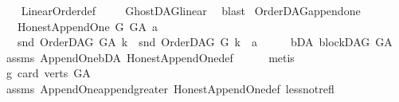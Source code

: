 \begin{isabellebody}
\ \ %
\endisadelimproof
%
\isatagproof
{}\isamarkupfalse%
\ Linear{\isacharunderscore}{\kern0pt}Order{\isacharunderscore}{\kern0pt}def\ \isanewline
\ \ \isamarkupfalse%
\ GhostDAG{\isacharunderscore}{\kern0pt}linear\ \isamarkupfalse%
\ blast%
\endisatagproof
{\isafoldproof}%
%
\isadelimproof
%
\endisadelimproof
%
\isadelimdocument
%
\endisadelimdocument
%
\isatagdocument
%
\isamarkuptrue%
%
\endisatagdocument
{\isafolddocument}%
%
\isadelimdocument
%
\endisadelimdocument
{}\isamarkupfalse%
\ OrderDAG{\isacharunderscore}{\kern0pt}append{\isacharunderscore}{\kern0pt}one{\isacharcolon}{\kern0pt}\isanewline
\ \ \ {\isachardoublequoteopen}Honest{\isacharunderscore}{\kern0pt}Append{\isacharunderscore}{\kern0pt}One\ G\ G{\isacharunderscore}{\kern0pt}A\ a{\isachardoublequoteclose}\isanewline
\ \ \ {\isachardoublequoteopen}snd\ {\isacharparenleft}{\kern0pt}OrderDAG\ G{\isacharunderscore}{\kern0pt}A\ k{\isacharparenright}{\kern0pt}\ {\isacharequal}{\kern0pt}\ snd\ {\isacharparenleft}{\kern0pt}OrderDAG\ G\ k{\isacharparenright}{\kern0pt}\ {\isacharat}{\kern0pt}\ {\isacharbrackleft}{\kern0pt}a{\isacharbrackright}{\kern0pt}{\isachardoublequoteclose}\isanewline
%
\isadelimproof
%
\endisadelimproof
%
\isatagproof
{}\isamarkupfalse%
\ {\isacharminus}{\kern0pt}\isanewline
\ \ \isamarkupfalse%
\ bD{\isacharunderscore}{\kern0pt}A{\isacharcolon}{\kern0pt}\ {\isachardoublequoteopen}blockDAG\ G{\isacharunderscore}{\kern0pt}A{\isachardoublequoteclose}\ \isamarkupfalse%
\ assms\ Append{\isacharunderscore}{\kern0pt}One{\isachardot}{\kern0pt}bD{\isacharunderscore}{\kern0pt}A\ Honest{\isacharunderscore}{\kern0pt}Append{\isacharunderscore}{\kern0pt}One{\isacharunderscore}{\kern0pt}def\isanewline
\ \ \ \ \isamarkupfalse%
\ metis\isanewline
\ \ \isamarkupfalse%
\ g{}{\isacharcolon}{\kern0pt}\ {\isachardoublequoteopen}card\ {\isacharparenleft}{\kern0pt}verts\ G{\isacharunderscore}{\kern0pt}A{\isacharparenright}{\kern0pt}\ {\isasymnoteq}\ {}{\isachardoublequoteclose}\ \isanewline
\ \ \ \ \isamarkupfalse%
\ assms\ Append{\isacharunderscore}{\kern0pt}One{\isachardot}{\kern0pt}append{\isacharunderscore}{\kern0pt}greater{\isacharunderscore}{\kern0pt}{}\ Honest{\isacharunderscore}{\kern0pt}Append{\isacharunderscore}{\kern0pt}One{\isacharunderscore}{\kern0pt}def\ less{\isacharunderscore}{\kern0pt}not{\isacharunderscore}{\kern0pt}refl\isanewline

\end{isabellebody}
